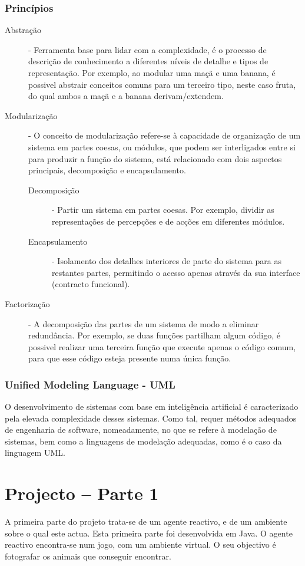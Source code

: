 \documentclass[a4paper,12pt]{article}
\begin{document}
\subsubsection{Princípios}
\begin{description}
	\item[Abstração] - Ferramenta base para lidar com a complexidade, é o processo de descrição de conhecimento a diferentes níveis de detalhe e tipos de representação. Por exemplo, ao modular uma maçã e uma banana, é possivel abstrair conceitos comuns para um terceiro tipo, neste caso fruta, do qual ambos a maçã e a banana derivam/extendem.
	\item[Modularização] - O conceito de modularização refere-se à capacidade de organização de um sistema em partes coesas, ou módulos, que podem ser interligados entre si para produzir a função do sistema, está relacionado com dois aspectos principais, decomposição e encapsulamento.
		\begin{description}
			\item[Decomposição] - Partir um sistema em partes coesas. Por exemplo, dividir as representações de percepções e de acções em diferentes módulos.
			\item[Encapsulamento] - Isolamento dos detalhes interiores de parte do sistema para as restantes partes, permitindo o acesso apenas através da sua interface (contracto funcional).
		\end{description}
	\item[Factorização] - A decomposição das partes de um sistema de modo a eliminar redundância. Por exemplo, se duas funções partilham algum código, é possivel realizar uma terceira função que execute apenas o código comum, para que esse código esteja presente numa única função.
\end{description}

\subsubsection{Unified Modeling Language - UML}
O desenvolvimento de sistemas com base em inteligência artificial é caracterizado pela elevada complexidade desses sistemas. Como tal, requer métodos adequados de engenharia de software, nomeadamente, no que se
refere à modelação de sistemas, bem como a linguagens de modelação adequadas, como é o caso da linguagem UML.
	
\newpage
\section{Projecto – Parte 1}
A primeira parte do projeto trata-se de um agente reactivo, e de um ambiente sobre o qual este actua. Esta primeira parte foi desenvolvida em Java.
O agente reactivo encontra-se num jogo, com um ambiente virtual. O seu objectivo é fotografar os animais que conseguir encontrar.
\end{document}
